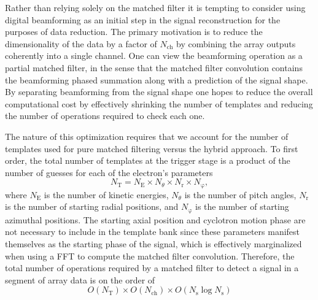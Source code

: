 Rather than relying solely on the matched filter it is tempting to consider using digital beamforming as an initial step in the signal reconstruction for the purposes of data reduction. The primary motivation is to reduce the dimensionality of the data by a factor of $N_\mathrm{ch}$ by combining the array outputs coherently into a single channel. One can view the beamforming operation as a partial matched filter, in the sense that the matched filter convolution contains the beamforming phased summation along with a prediction of the signal shape. By separating beamforming from the signal shape one hopes to reduce the overall computational cost by effectively shrinking the number of templates and reducing the number of operations required to check each one.

The nature of this optimization requires that we account for the number of templates used for pure matched filtering versus the hybrid approach. To first order, the total number of templates at the trigger stage is a product of the number of guesses for each of the electron's parameters
\begin{equation}
    N_\mathrm{T}=N_\mathrm{E}\times N_\theta \times N_\mathrm{r} \times N_\mathrm{\varphi},
\end{equation}
where $N_\mathrm{E}$ is the number of kinetic energies, $N_\theta$ is the number of pitch angles, $N_\mathrm{r}$ is the number of starting radial positions, and $N_\mathrm{\varphi}$ is the number of starting azimuthal positions. The starting axial position and cyclotron motion phase are not necessary to include in the template bank since these parameters manifest themselves as the starting phase of the signal, which is effectively marginalized when using a FFT to compute the matched filter convolution. Therefore, the total number of operations required by a matched filter to detect a signal in a segment of array data is on the order of 
\begin{equation}
    O(N_\mathrm{T})\times O(N_\mathrm{ch})\times O(N_\mathrm{s}\log{N_\mathrm{s}})
    \label{eq:chap4-tot-ops-pure-mf}
\end{equation}

